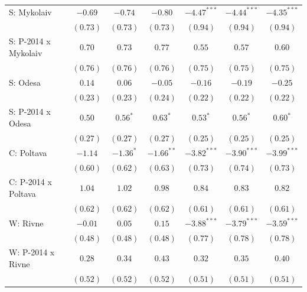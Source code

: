 \begin{table}
\begin{center}
\begin{small}
\begin{tabular}{l c c c c c c}
S: Mykolaiv                 & $-0.69$       & $-0.74$      & $-0.80$        & $-4.47^{***}$ & $-4.44^{***}$ & $-4.35^{***}$ \\
                            & $(0.73)$      & $(0.73)$     & $(0.73)$       & $(0.94)$      & $(0.94)$      & $(0.94)$      \\
S: P-2014 x Mykolaiv        & $0.70$        & $0.73$       & $0.77$         & $0.55$        & $0.57$        & $0.60$        \\
                            & $(0.76)$      & $(0.76)$     & $(0.76)$       & $(0.75)$      & $(0.75)$      & $(0.75)$      \\
S: Odesa                    & $0.14$        & $0.06$       & $-0.05$        & $-0.16$       & $-0.19$       & $-0.25$       \\
                            & $(0.23)$      & $(0.23)$     & $(0.24)$       & $(0.22)$      & $(0.22)$      & $(0.22)$      \\
S: P-2014 x Odesa           & $0.50$        & $0.56^{*}$   & $0.63^{*}$     & $0.53^{*}$    & $0.56^{*}$    & $0.60^{*}$    \\
                            & $(0.27)$      & $(0.27)$     & $(0.27)$       & $(0.25)$      & $(0.25)$      & $(0.25)$      \\
C: Poltava                  & $-1.14$       & $-1.36^{*}$  & $-1.66^{**}$   & $-3.82^{***}$ & $-3.90^{***}$ & $-3.99^{***}$ \\
                            & $(0.60)$      & $(0.62)$     & $(0.63)$       & $(0.73)$      & $(0.74)$      & $(0.73)$      \\
C: P-2014 x Poltava         & $1.04$        & $1.02$       & $0.98$         & $0.84$        & $0.83$        & $0.82$        \\
                            & $(0.62)$      & $(0.62)$     & $(0.62)$       & $(0.61)$      & $(0.61)$      & $(0.61)$      \\
W: Rivne                    & $-0.01$       & $0.05$       & $0.15$         & $-3.88^{***}$ & $-3.79^{***}$ & $-3.59^{***}$ \\
                            & $(0.48)$      & $(0.48)$     & $(0.48)$       & $(0.77)$      & $(0.78)$      & $(0.78)$      \\
W: P-2014 x Rivne           & $0.28$        & $0.34$       & $0.43$         & $0.32$        & $0.35$        & $0.40$        \\
                            & $(0.52)$      & $(0.52)$     & $(0.52)$       & $(0.51)$      & $(0.51)$      & $(0.51)$      \\

\end{tabular}
\end{small}
\end{center}
\end{table}
